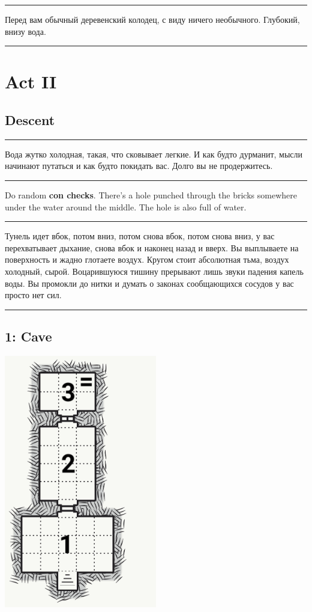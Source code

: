 \documentclass[a5paper,11pt]{book}
\newenvironment{boxed}
{\em\noindent\rule[1ex]{\linewidth}{0.1pt}\linebreak\indent}
{\par\noindent\rule[1ex]{\linewidth}{0.1pt}}
\begin{document}
\begin{multicols}{2}
\begin{boxed}
  Перед вам обычный деревенский колодец, с виду ничего необычного. Глубокий, внизу вода.
\end{boxed}

\section{Act II}

\subsection{Descent}

\begin{boxed}
Вода жутко холодная, такая, что сковывает легкие. И как будто дурманит, мысли начинают путаться и как будто покидать вас. Долго вы не продержитесь.
\end{boxed}

Do random \textbf{con checks}. There's a hole punched through the bricks somewhere under the water around the middle. The hole is also full of water.

\begin{boxed}
Тунель идет вбок, потом вниз, потом снова вбок, потом снова вниз, у вас перехватывает дыхание, снова вбок и наконец назад и вверх. Вы выплываете на поверхность и жадно глотаете воздух. Кругом стоит абсолютная тьма, воздух холодный, сырой. Воцарившуюся тишину прерывают лишь звуки падения капель воды. Вы промокли до нитки и думать о законах сообщающихся сосудов у вас просто нет сил. 
\end{boxed}

\subsection{1: Cave}
\includegraphics[width=0.5\textwidth]{1}


\end{multicols}
\end{document}
